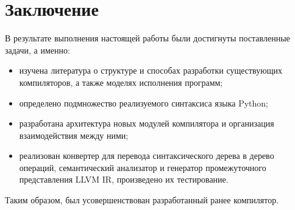 \newpage
\section*{Заключение}

В результате выполнения настоящей работы были достигнуты поставленные задачи, а именно:

\begin{itemize}
    \item изучена литература о структуре и способах разработки существующих компиляторов, а также моделях исполнения программ;
    \item определено подмножество реализуемого синтаксиса языка Python;
    \item разработана архитектура новых модулей компилятора и организация взаимодействия между ними;
    \item реализован конвертер для перевода синтаксического дерева в дерево операций, семантический анализатор и генератор промежуточного представления LLVM IR, произведено их тестирование.
\end{itemize}

Таким образом, был усовершенствован разработанный ранее компилятор.
